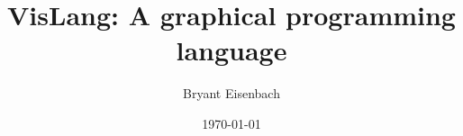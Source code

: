 \documentclass[dvips,10pt]{article}
\begin{document}
\title{VisLang: A graphical programming language}
\author{Bryant Eisenbach}
\date{\today}
\maketitle









\end{document}
